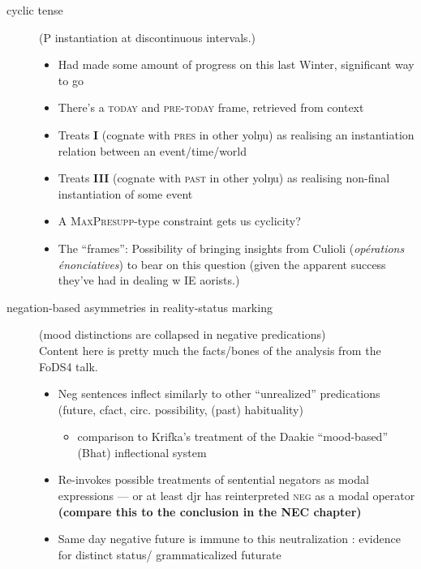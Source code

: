 \documentclass[11pt,dvipsnames]{article}
\begin{document}
\begin{description}
\begin{description}
		\item[cyclic tense] (P instantiation at discontinuous intervals.)
		\begin{itemize}
			\item Had made some amount of progress on this last Winter, significant way to go
			\item There's a \textsc{today} and \textsc{pre-today} frame, retrieved from context
			\item Treats \textbf{I} (cognate with \textsc{pres} in other yolŋu) as realising an instantiation relation between an event/time/world
			\item Treats \textbf{III} (cognate with \textsc{past} in other yolŋu) as realising non-final instantiation of some event
			\item A \textsc{MaxPresupp}-type constraint gets us cyclicity?
			\item The ``frames'': Possibility of bringing insights from Culioli (\textit{opérations énonciatives}) to bear on this question (given the apparent success they've had in dealing w IE aorists.)
						\end{itemize}
		\item[negation-based asymmetries in reality-status marking] (mood distinctions are collapsed in negative predications)\\
		Content here is pretty much the facts/bones of the analysis from the FoDS4 talk.
		\begin{itemize}
					\item Neg sentences inflect similarly to other ``unrealized'' predications (future, cfact, circ. possibility, (past) habituality)
					\begin{itemize}
						\item comparison to Krifka's treatment of the Daakie ``mood-based'' (Bhat) inflectional system
					\end{itemize}
					\item Re-invokes possible treatments of sentential negators as modal expressions --- or at least djr has reinterpreted \textsc{neg} as a modal operator \textbf{(compare this to the conclusion in the NEC chapter)}
					\item Same day negative future is immune to this neutralization : evidence for distinct status/ grammaticalized futurate


\end{itemize}
\end{description}
\end{description}
\end{document}
